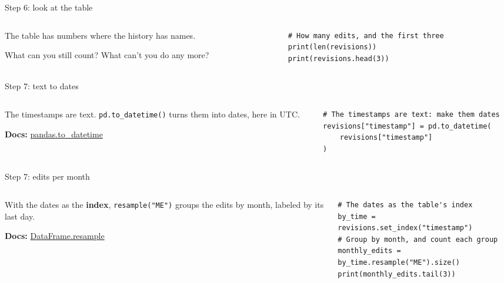 \documentclass[9pt,aspectratio=169]{beamer}
\begin{document}
\begin{frame}[fragile]{Step 6: look at the table}
    \begin{columns}[T]
        \begin{column}{0.37\textwidth}
            The table has numbers where the history has names.

            \medskip
            What can you still count? What can't you do any more?
        \end{column}
        \begin{column}{0.6\textwidth}
\begin{lstlisting}
# How many edits, and the first three
print(len(revisions))
print(revisions.head(3))
\end{lstlisting}
        \end{column}
    \end{columns}
\end{frame}

\begin{frame}[fragile]{Step 7: text to dates}
    \begin{columns}[T]
        \begin{column}{0.37\textwidth}
            The timestamps are text. \texttt{pd.to\_datetime()} turns them into dates, here in UTC.

            \medskip
            {\scriptsize\textbf{Docs:} \href{https://pandas.pydata.org/docs/reference/api/pandas.to_datetime.html}{pandas.to\_datetime}\par}
        \end{column}
        \begin{column}{0.6\textwidth}
\begin{lstlisting}
# The timestamps are text: make them dates
revisions["timestamp"] = pd.to_datetime(
    revisions["timestamp"]
)
\end{lstlisting}
        \end{column}
    \end{columns}
\end{frame}

\begin{frame}[fragile]{Step 7: edits per month}
    \begin{columns}[T]
        \begin{column}{0.37\textwidth}
            With the dates as the \textbf{index}, \texttt{resample("ME")} groups the edits by month, labeled by its last day.

            \medskip
            {\scriptsize\textbf{Docs:} \href{https://pandas.pydata.org/docs/reference/api/pandas.DataFrame.resample.html}{DataFrame.resample}\par}
        \end{column}
        \begin{column}{0.6\textwidth}
\begin{lstlisting}
# The dates as the table's index
by_time = revisions.set_index("timestamp")
# Group by month, and count each group
monthly_edits = by_time.resample("ME").size()
print(monthly_edits.tail(3))
\end{lstlisting}
        \end{column}
    \end{columns}
\end{frame}
\end{document}
